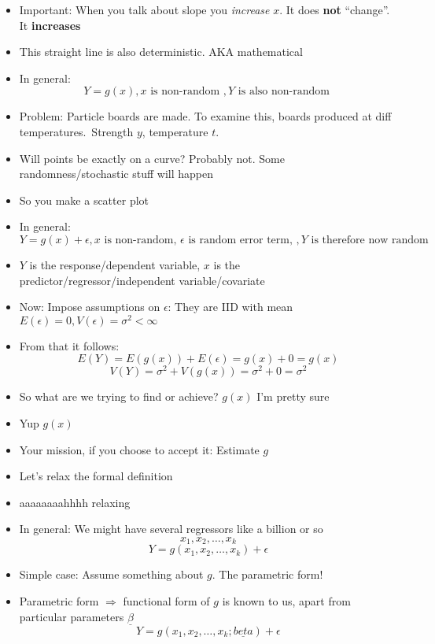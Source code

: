 \documentclass{article}
\begin{document}
\begin{itemize}
    \item Important: When you talk about slope you \textit{increase} $ x $. It does \textbf{not} ``change''. It \textbf{increases}
    \item This straight line is also deterministic. AKA mathematical
    \item In general:
      \[
        Y = g(x), x \text{ is non-random }, Y \text{ is also non-random }
      \] 
    \item Problem: Particle boards are made. To examine this, boards produced at diff temperatures.\ Strength $ y $, temperature $ t $.
    \item Will points be exactly on a curve? Probably not. Some randomness/stochastic stuff will happen
    \item So you make a scatter plot
    \item In general:
      \[
        Y = g(x) + \epsilon, x  \text{ is non-random, } \epsilon \text{ is random error term, }, Y \text{ is therefore now random }
      \] 
    \item $ Y $ is the response/dependent variable, $ x $ is the predictor/regressor/independent variable/covariate
    \item Now: Impose assumptions on  $ \epsilon $:  They are IID with mean $ E(\epsilon) = 0 , V(\epsilon) = \sigma^2 < \infty $
    \item From that it follows:
      \[
        E(Y) = E(g(x)) + E(\epsilon) = g(x) + 0 = g(x)
      \] 
      \[
        V(Y) = \sigma^2 + V(g(x)) = \sigma^2 + 0 = \sigma^2
      \] 
    \item So what are we trying to find or achieve? $ g(x) $ I'm pretty sure
    \item Yup $ g(x) $
    \item Your mission, if you choose to accept it: Estimate $ g $
    \item Let's relax the formal definition
    \item aaaaaaaahhhh relaxing
    \item In general: We might have several regressors like a billion or so
       \[
        x_1, x_2, \ldots, x_k
      \] 
      \[
        Y = g(x_1, x_2, \ldots, x_k) + \epsilon
      \] 
    \item Simple case: Assume something about $ g $. The parametric form!
    \item Parametric form  $ \Rightarrow $ functional form of $ g $ is known to us, apart from particular parameters  $  \underline{ \beta } $
      \[
        Y = g(x_1, x_2, \ldots, x_k; \underline{beta}) + \epsilon
\]
\end{itemize}
\end{document}
